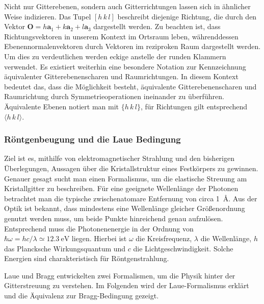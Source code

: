 Nicht nur Gitterebenen, sondern auch Gitterrichtungen lassen sich in ähnlicher Weise indizieren.
Das Tupel $[h\,k\,l]$ beschreibt diejenige Richtung, die durch den Vektor $\mathbf{O} = h\mathbf{a}_{1}+k\mathbf{a}_{2}+
l\mathbf{a}_{3}$ dargestellt werden.
Zu beachten ist, dass Richtungsvektoren in unserem Kontext im Ortsraum leben,
währenddessen Ebenennormalenvektoren durch Vektoren im reziproken Raum dargestellt werden.
Um dies zu verdeutlichen werden eckige anstelle der runden Klammern verwendet.
Es existiert weiterhin eine besondere Notation zur Kennzeichnung äquivalenter Gitterebenenscharen und Raumrichtungen.
In diesem Kontext bedeutet das, dass die Möglichkeit besteht, äquivalente Gitterebenenscharen und Raumrichtung durch
Symmetrieoperationen ineinander zu überführen.
Äquivalente Ebenen notiert man mit $\{h \,k\, l \}$, für Richtungen gilt entsprechend $\langle h\, k \, l \rangle$.
\autocite[116]{Ashcroft}

\subsubsection{Röntgenbeugung und die Laue Bedingung}
Ziel ist es, mithilfe von elektromagnetischer Strahlung und den bisherigen Überlegungen, Aussagen über die
Kristallstruktur eines Festkörpers zu gewinnen.
Genauer gesagt sucht man einen Formalismus, um die elastische Streuung am Kristallgitter zu beschreiben.
Für eine geeignete Wellenlänge der Photonen betrachtet man die typische zwischenatomare Entfernung von circa
\qty{1}{\angstrom}.
Aus der Optik ist bekannt, dass mindestens eine Wellenlänge gleicher Größenordnung genutzt werden
muss, um beide Punkte hinreichend genau aufzulösen.
Entsprechend muss die Photonenenergie in der Ordnung von
$\hbar \omega=hc / \lambda \simeq \qty{12.3}{\electronvolt}$ liegen.
Hierbei ist $\omega$ die Kreisfrequenz, $\lambda$ die Wellenlänge, $h$ das Plancksche Wirkungsquantum und $c$ die
Lichtgeschwindigkeit.
Solche Energien sind charakteristisch für Röntgenstrahlung.

Laue und Bragg entwickelten zwei Formalismen, um die Physik hinter der Gitterstreuung zu verstehen.
Im Folgenden wird der Laue-Formalismus erklärt und die Äquivalenz zur Bragg-Bedingung gezeigt.

